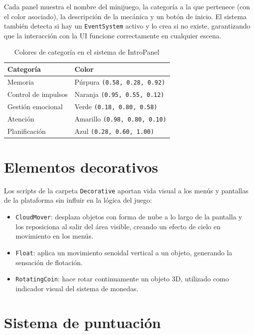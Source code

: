 \documentclass[12pt, a4paper]{report}
\begin{document}
Cada panel muestra el nombre del minijuego, la categoría a la que pertenece
(con el color asociado), la descripción de la mecánica y un botón de inicio.
El sistema también detecta si hay un \texttt{EventSystem} activo y lo crea si
no existe, garantizando que la interacción con la UI funcione correctamente en
cualquier escena.

\begin{table}[H]
\centering
\caption{Colores de categoría en el sistema de IntroPanel}
\label{tab:colores}
\begin{tabular}{ll}
\toprule
\textbf{Categoría} & \textbf{Color} \\
\midrule
Memoria              & Púrpura \texttt{(0.58, 0.28, 0.92)} \\
Control de impulsos  & Naranja \texttt{(0.95, 0.55, 0.12)} \\
Gestión emocional    & Verde   \texttt{(0.18, 0.80, 0.58)} \\
Atención             & Amarillo \texttt{(0.98, 0.80, 0.10)} \\
Planificación        & Azul    \texttt{(0.28, 0.60, 1.00)} \\
\bottomrule
\end{tabular}
\end{table}

\section{Elementos decorativos}

Los scripts de la carpeta \texttt{Decorative} aportan vida visual a los menús
y pantallas de la plataforma sin influir en la lógica del juego:

\begin{itemize}
  \item \texttt{CloudMover}: desplaza objetos con forma de nube a lo largo
    de la pantalla y los reposiciona al salir del área visible, creando un
    efecto de cielo en movimiento en los menús.
  \item \texttt{Float}: aplica un movimiento senoidal vertical a un objeto,
    generando la sensación de flotación.
  \item \texttt{RotatingCoin}: hace rotar continuamente un objeto 3D,
    utilizado como indicador visual del sistema de monedas.
\end{itemize}

\section{Sistema de puntuación}
\end{document}
